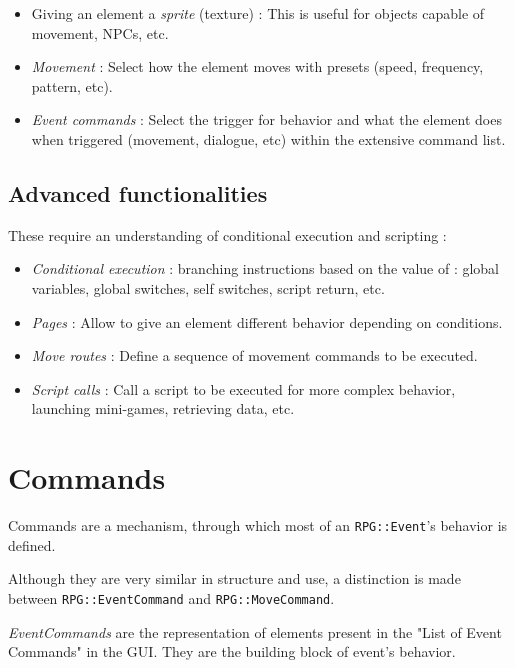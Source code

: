 \documentclass[11pt]{article}
\begin{document}
\begin{itemize}
	\item Giving an element a \textit{sprite} (texture) : This is useful for objects capable of movement, NPCs, etc.
	
	\item \textit{Movement} : Select how the element moves with presets (speed, frequency, pattern, etc).
	
	\item \textit{Event commands} : Select the trigger for behavior and what the element does when triggered (movement, dialogue, etc) within the extensive command list.
\end{itemize}

\subsection{Advanced functionalities}

These require an understanding of conditional execution and scripting :

\begin{itemize}
	\item \textit{Conditional execution} : branching instructions based on the value of : global variables, global switches, self switches, script return, etc.
	
	\item \textit{Pages} : Allow to give an element different behavior depending on conditions.
	
	\item \textit{Move routes} : Define a sequence of movement commands to be executed.
	
	\item \textit{Script calls} : Call a script to be executed for more complex behavior, launching mini-games, retrieving data, etc.
\end{itemize}



\newpage
\section{Commands}

Commands are a mechanism, through which most of an \verb|RPG::Event|'s behavior is defined.

Although they are very similar in structure and use, a distinction is made between \verb|RPG::EventCommand| and \verb|RPG::MoveCommand|.

\textit{EventCommands} are the representation of elements present in the "List of Event Commands" in the GUI. They are the building block of event's behavior.
\end{document}
